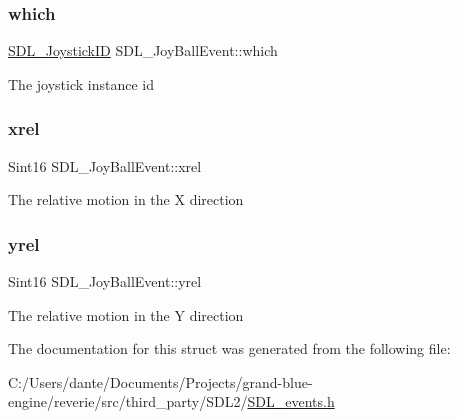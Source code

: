 \subsubsection{\texorpdfstring{which}{which}}
{\footnotesize\ttfamily \mbox{\hyperlink{_s_d_l__joystick_8h_a3c3d32500cb08f76ee8077983912c0bd}{S\+D\+L\+\_\+\+Joystick\+ID}} S\+D\+L\+\_\+\+Joy\+Ball\+Event\+::which}

The joystick instance id \mbox{\label{struct_s_d_l___joy_ball_event_a959a8473aa1964e5e1778c27a9ffd261}} 
\subsubsection{\texorpdfstring{xrel}{xrel}}
{\footnotesize\ttfamily Sint16 S\+D\+L\+\_\+\+Joy\+Ball\+Event\+::xrel}

The relative motion in the X direction \mbox{\label{struct_s_d_l___joy_ball_event_a28ad48a9eb7a5d3ff62ccba09fcead76}} 
\subsubsection{\texorpdfstring{yrel}{yrel}}
{\footnotesize\ttfamily Sint16 S\+D\+L\+\_\+\+Joy\+Ball\+Event\+::yrel}

The relative motion in the Y direction 

The documentation for this struct was generated from the following file\+:\begin{DoxyCompactItemize}
\item 
C\+:/\+Users/dante/\+Documents/\+Projects/grand-\/blue-\/engine/reverie/src/third\+\_\+party/\+S\+D\+L2/\mbox{\hyperlink{_s_d_l__events_8h}{S\+D\+L\+\_\+events.\+h}}\end{DoxyCompactItemize}
